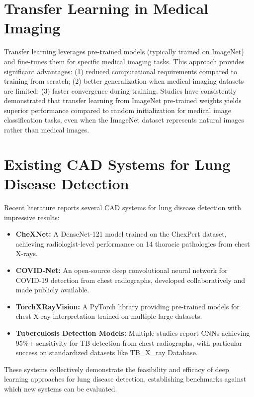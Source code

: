 {\section{Transfer Learning in Medical Imaging}

Transfer learning leverages pre-trained models (typically trained on ImageNet) and fine-tunes them for specific medical imaging tasks. This approach provides significant advantages: (1) reduced computational requirements compared to training from scratch; (2) better generalization when medical imaging datasets are limited; (3) faster convergence during training. Studies have consistently demonstrated that transfer learning from ImageNet pre-trained weights yields superior performance compared to random initialization for medical image classification tasks, even when the ImageNet dataset represents natural images rather than medical images.

\section{Existing CAD Systems for Lung Disease Detection}

Recent literature reports several CAD systems for lung disease detection with impressive results:

\begin{itemize}
    \item \textbf{CheXNet:} A DenseNet-121 model trained on the ChexPert dataset, achieving radiologist-level performance on 14 thoracic pathologies from chest X-rays.
    \item \textbf{COVID-Net:} An open-source deep convolutional neural network for COVID-19 detection from chest radiographs, developed collaboratively and made publicly available.
    \item \textbf{TorchXRayVision:} A PyTorch library providing pre-trained models for chest X-ray interpretation trained on multiple large datasets.
    \item \textbf{Tuberculosis Detection Models:} Multiple studies report CNNs achieving 95\%+ sensitivity for TB detection from chest radiographs, with particular success on standardized datasets like TB\_X\_ray Database.
\end{itemize}

These systems collectively demonstrate the feasibility and efficacy of deep learning approaches for lung disease detection, establishing benchmarks against which new systems can be evaluated.

}
